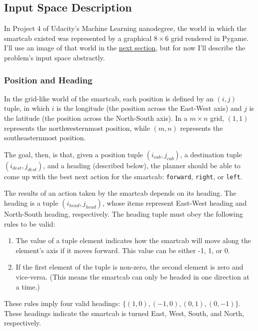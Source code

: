 \documentclass{article}
\begin{document}
\subsection{Input Space Description}
\label{sec:input}

In Project 4 of Udacity's Machine Learning nanodegree, the world in which the smartcab existed was represented by a graphical $8\times6$ grid rendered in Pygame. I'll use an image of that world in the \hyperref[sec:explovis]{next section}, but for now I'll describe the problem's input space abstractly.

\subsubsection{Position and Heading}

In the grid-like world of the smartcab, each position is defined by an $(i, j)$ tuple, in which $i$ is the longitude (the position across the East-West axis) and $j$ is the latitude (the position across the North-South axis). In a $m\times n$ grid, $(1, 1)$ represents the northwesternmost position, while $(m, n)$ represents the southeasternmost position.

The goal, then, is that, given a position tuple $(i_{cab}, j_{cab})$, a destination tuple $(i_{dest}, j_{dest})$, and a heading (described below), the planner should be able to come up with the best next action for the smartcab: \texttt{forward}, \texttt{right}, or \texttt{left}. 

The results of an action taken by the smartcab depends on its heading. The heading is a tuple $(i_{head}, j_{head})$, whose items represent East-West heading and North-South heading, respectively. The heading tuple must obey the following rules to be valid:

\begin{enumerate}
   \item The value of a tuple element indicates how the smartcab will move along the element's axis if it moves forward. This value can be either -1, 1, or 0.
   \item If the first element of the tuple is non-zero, the second element is zero and vice-versa. (This means the smartcab can only be headed in one direction at a time.)
\end{enumerate}

These rules imply four valid headings: $\{(1, 0), (-1, 0), (0, 1), (0, -1)\}$. These headings indicate the smartcab is turned East, West, South, and North, respectively.
 
\end{document}
